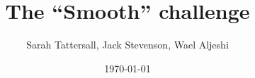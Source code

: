 \title{The ``Smooth'' challenge}

\author{Sarah Tattersall, Jack Stevenson, Wael Aljeshi}

\date{\today}